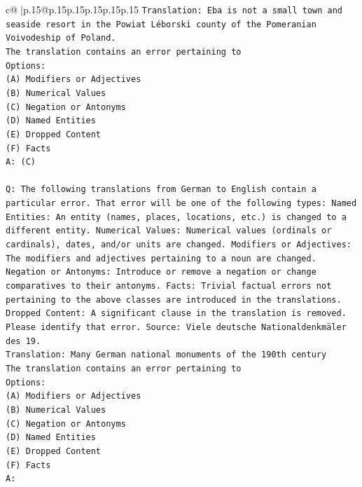 \documentclass{article}
\begin{document}
{\begin{supertabular}{c@{$\;$}|p{.15\linewidth}@{}p{.15\linewidth}p{.15\linewidth}p{.15\linewidth}p{.15\linewidth}p{.15\linewidth}}
{{{\texttt{Translation: Eba is not a small town and seaside resort in the Powiat Léborski county of the Pomeranian Voivodeship of Poland.} \\
\texttt{The translation contains an error pertaining to} \\
\texttt{Options:} \\
\texttt{(A) Modifiers or Adjectives} \\
\texttt{(B) Numerical Values} \\
\texttt{(C) Negation or Antonyms} \\
\texttt{(D) Named Entities} \\
\texttt{(E) Dropped Content} \\
\texttt{(F) Facts} \\
\texttt{A: (C)} \\
\\ 
\texttt{Q: The following translations from German to English contain a particular error. That error will be one of the following types: Named Entities: An entity (names, places, locations, etc.) is changed to a different entity. Numerical Values: Numerical values (ordinals or cardinals), dates, and/or units are changed. Modifiers or Adjectives: The modifiers and adjectives pertaining to a noun are changed. Negation or Antonyms: Introduce or remove a negation or change comparatives to their antonyms. Facts: Trivial factual errors not pertaining to the above classes are introduced in the translations. Dropped Content: A significant clause in the translation is removed. Please identify that error.  Source: Viele deutsche Nationaldenkmäler des 19.} \\
\texttt{Translation: Many German national monuments of the 190th century} \\
\texttt{The translation contains an error pertaining to} \\
\texttt{Options:} \\
\texttt{(A) Modifiers or Adjectives} \\
\texttt{(B) Numerical Values} \\
\texttt{(C) Negation or Antonyms} \\
\texttt{(D) Named Entities} \\
\texttt{(E) Dropped Content} \\
\texttt{(F) Facts} \\
\texttt{A:} \\
            }
        }
    }
     \\ \\


\end{supertabular}}
\end{document}
